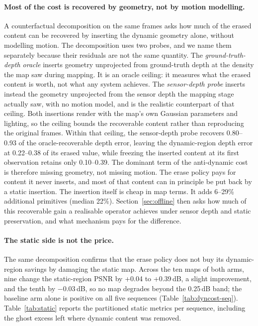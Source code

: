 \documentclass[10pt,twocolumn,letterpaper]{article}
\newcommand{\gate}[1]{{#1}} %
\begin{document}
\paragraph{Most of the cost is recovered by geometry, not by motion modelling.}
A counterfactual decomposition on the same frames asks how much of the erased content
can be recovered by inserting the dynamic geometry alone, without modelling motion.
The decomposition uses two probes, and we name them separately because their residuals
are not the same quantity.
The \emph{ground-truth-depth oracle} inserts geometry unprojected from ground-truth depth at the
density the map saw during mapping. It is an oracle ceiling: it measures what the erased
content is worth, not what any system achieves.
The \emph{sensor-depth probe} inserts instead the geometry unprojected from the sensor
depth the mapping stage actually saw, with no motion model, and is the realistic
counterpart of that ceiling. Both insertions render
with the map's own Gaussian parameters and lighting, so the ceiling bounds the
recoverable content rather than reproducing the original frames.
Within that ceiling, the sensor-depth probe recovers \gate{0.80--0.93} of
the
oracle-recoverable depth error, leaving the dynamic-region depth error at
\gate{0.22--0.38} of its erased value, while freezing the inserted content at its
first observation retains only \gate{0.10--0.39}. %
 The dominant term of the anti-dynamic cost is therefore missing geometry, not missing motion. The
 erase policy pays for content it never inserts, and most of that content
can in principle be put back by a static insertion. The insertion itself is cheap in map terms. It
adds \gate{6--29\%} additional primitives (median \gate{22\%}). %
Section~\ref{sec:offline} then asks how much of this recoverable gain a realisable operator
achieves under sensor depth and static preservation, and what mechanism pays for the
difference.

\paragraph{The static side is not the price.}
The same decomposition confirms that the erase policy does not buy its dynamic-region savings by
damaging the static map. Across the ten maps of both arms, nine change the static-region PSNR by
\gate{+0.04} to \gate{+0.39}\,dB, a slight improvement, and the tenth by \gate{$-0.03$}\,dB, so no
map degrades beyond the \gate{0.25}\,dB band; the
baseline arm alone is positive on all five sequences (Table~\ref{tab:dyncost-seq}). %
 Table~\ref{tab:static} reports the partitioned static metrics per sequence, including
the ghost excess left where dynamic content was removed.
\end{document}
